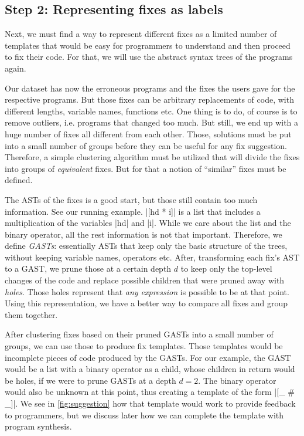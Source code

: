 \subsection{Step 2: Representing fixes as labels}
\label{subsec:step2}

Next, we must find a way to represent different fixes as a limited number of templates that would be easy for
programmers to understand and then proceed to fix their code. For that, we will use the abstract syntax trees of the
programs again.

 Our dataset has now the erroneous programs and the fixes the users gave for the
respective programs. But those fixes can be arbitrary replacements of code, with different lengths, variable names,
functions etc. One thing is to do, of course is to remove outliers, i.e. programs that changed too much. But still, we
end up with a huge number of fixes all different from each other. Those, solutions must be put into a small number of
groups before they can be useful for any fix suggestion. Therefore, a simple clustering algorithm must be utilized that
will divide the fixes into groups of \emph{equivalent} fixes. But for that a notion of “similar” fixes must be defined.

 The ASTs of the fixes is a good start, but those still contain too much
information. See our running example. |[hd * i]| is a list that includes a multiplication of the variables |hd| and |i|.
While we care about the list and the binary operator, all the rest information is not that important. Therefore, we
define \emph{GASTs}: essentially ASTs that keep only the basic structure of the trees, without keeping variable names,
operators etc. After, transforming each fix’s AST to a GAST, we prune those at a certain depth $d$ to keep only the
top-level changes of the code and replace possible children that were pruned away with \emph{holes}. Those holes
represent that \emph{any expression} is possible to be at that point. Using this representation, we have a better way to
compare all fixes and group them together.

 After clustering fixes based on their pruned GASTs into a small number of groups, we can use those
to produce fix templates. Those templates would be incomplete pieces of code produced by the GASTs. For our example, the
GAST would be a list with a binary operator as a child, whose children in return would be holes, if we were to prune
GASTs at a depth $d = 2$. The binary operator would also be unknown at this point, thus creating a template of the form
|[_ # _]|. We see in \autoref{fig:suggestion} how that template would work to provide feedback to programmers, but we
discuss later how we can complete the template with program synthesis.

